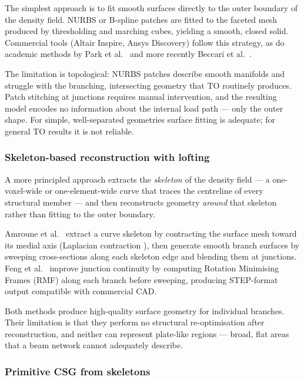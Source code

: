 \documentclass[11pt,a4paper]{article}
\begin{document}
The simplest approach is to fit smooth surfaces directly to the outer boundary
of the density field.
NURBS or B-spline patches are fitted to the faceted mesh produced by
thresholding and marching cubes, yielding a smooth, closed solid.
Commercial tools (Altair Inspire, Ansys Discovery) follow this strategy, as do
academic methods by Park et al.\ \cite{park_surface_2019} and more recently
Beccari et al.\ \cite{beccari_topological_2025}.

The limitation is topological: NURBS patches describe smooth manifolds and
struggle with the branching, intersecting geometry that TO routinely produces.
Patch stitching at junctions requires manual intervention, and the resulting
model encodes no information about the internal load path --- only the outer
shape.
For simple, well-separated geometries surface fitting is adequate; for
general TO results it is not reliable.

\subsubsection{Skeleton-based reconstruction with lofting}

A more principled approach extracts the \emph{skeleton} of the density field
--- a one-voxel-wide or one-element-wide curve that traces the centreline of
every structural member --- and then reconstructs geometry \emph{around} that
skeleton rather than fitting to the outer boundary.

Amroune et al.\ \cite{amroune2021} extract a curve skeleton by contracting the
surface mesh toward its medial axis (Laplacian contraction \cite{au_skeleton_2008}),
then generate smooth branch surfaces by sweeping cross-sections along each
skeleton edge and blending them at junctions.
Feng et al.\ \cite{feng2025} improve junction continuity by computing
Rotation Minimising Frames (RMF) along each branch before sweeping, producing
STEP-format output compatible with commercial CAD.

Both methods produce high-quality surface geometry for individual branches.
Their limitation is that they perform no structural re-optimisation after
reconstruction, and neither can represent plate-like regions --- broad, flat
areas that a beam network cannot adequately describe.

\subsubsection{Primitive CSG from skeletons}
\end{document}
